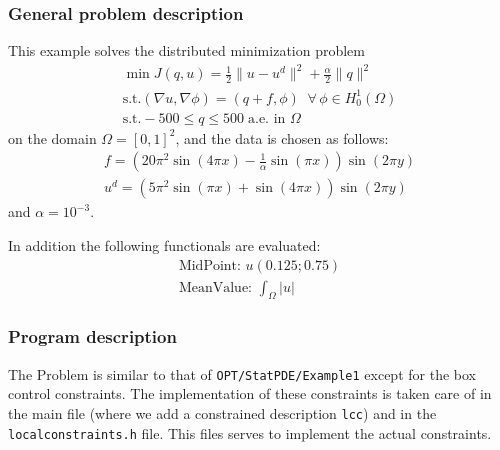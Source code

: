 \subsubsection{General problem description}
This example solves the distributed minimization problem
\begin{gather*}
\min J(q,u) = \frac{1}{2} \|u-u^d\|^2 + \frac{\alpha}{2}\|q\|^2\\
\text{s.t.} (\nabla u,\nabla \phi) = (q+f,\phi)\;\;\forall\,\phi \in H^1_0(\Omega)\\
\text{s.t.} -500 \le q \le 500\;\text{a.e. in }\Omega
\end{gather*}
on the domain $\Omega = [0,1]^2$, and the data is chosen as follows:
\begin{gather*}
 f = \left(20\pi^2  \sin(4 \pi x) - \frac{1}{\alpha}  \sin(\pi x)\right) \sin(2 \pi y)\\
 u^d = \left( 5 \pi^2 \sin(\pi x) + \sin(4 \pi x)\right)  \sin(2\pi y)
\end{gather*}
and $\alpha = 10^{-3}$.

In addition the following functionals are evaluated:
\begin{gather*}
  \text{MidPoint: } u(0.125 ; 0.75)\\[2mm]
  \text{MeanValue: }\int_\Omega |u|
\end{gather*}


\subsubsection{Program description}

The Problem is similar to that of \texttt{OPT/StatPDE/Example1} except for the box 
control constraints.
The implementation of these constraints is taken care of in the main file
(where we add a constrained description \texttt{lcc}) and in the
\texttt{localconstraints.h} file. This files serves to implement the actual constraints.
 

